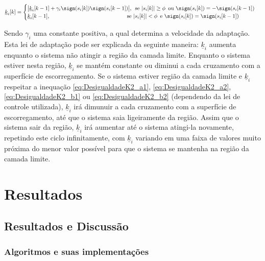 \documentclass[]{politex}
\begin{document}
\begin{equation}
\underline{k}_i[k] = \begin{cases}
\big| \underline{k}_i[k-1] + \gamma_i \sign(s_i [k]) \sign(s_i [k-1])  \big|, \, \text{ se } |s_i[k]| \geq \phi \, \text{ ou }  \sign(s_i [k]) = - \sign(s_i [k-1]) \\
\underline{k}_i[k-1], \;\;\;\;\;\;\;\;\;\;\;\;\;\;\;\;\;\;\;\;\;\;\;\;\;\;\;\;\;\;\;\;\;\;\;\;\;\;\;\;\;\;\;\;\;\;\;\;\;\, \text{ se } |s_i[k]| < \phi \, \text{ e }  \sign(s_i [k]) = \sign(s_i [k-1]) \\
 
\end{cases}
\end{equation}

Sendo $\gamma_i$ uma constante positiva, a qual determina a velocidade da adaptação. \\

Esta lei de adaptação pode ser explicada da seguinte maneira: $\underline{k}_i$ aumenta enquanto o sistema não atingir a região da camada limite. Enquanto o sistema estiver nesta região, $\underline{k}_i$ se mantém constante ou diminui a cada cruzamento com a superfície de escorregamento. Se o sistema estiver região da camada limite e $\underline{k}_i$ respeitar a inequação \eqref{eq:DesigualdadeK2_a1}, \eqref{eq:DesigualdadeK2_a2}, \eqref{eq:DesigualdadeK2_b1} ou \eqref{eq:DesigualdadeK2_b2} (dependendo da lei de controle utilizada), $\underline{k}_i$ irá dimunuir a cada cruzamento com a superfície de escorregamento, até que o sistema saia ligeiramente da região. Assim que o sistema sair da região, $\underline{k}_i$ irá aumentar até o sistema atingi-la novamente, repetindo este ciclo infinitamente, com $\underline{k}_i$ variando em uma faixa de valores muito próxima do menor valor possível para que o sistema se mantenha na região da camada limite.

\part{Resultados}

\chapter{Resultados e Discussão}

\section{Algoritmos e suas implementações}
\end{document}
